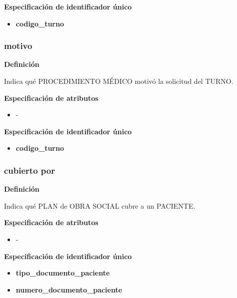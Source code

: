 \documentclass[a4paper,11pt]{article}
\begin{document}
\textbf{Especificación de identificador único}

\begin{itemize}

     \item \textbf{codigo\_turno}

\end{itemize}



\subsubsection{\textbf{motivo}}

\textbf{Definición}

Indica qué PROCEDIMIENTO MÉDICO motivó la solicitud del TURNO.

\textbf{Especificación de atributos}

\begin{itemize}

	\item -

\end{itemize}

\textbf{Especificación de identificador único}

\begin{itemize}

     \item \textbf{codigo\_turno}

\end{itemize}

\subsubsection{\textbf{cubierto por}}

\textbf{Definición}

Indica qué PLAN de OBRA SOCIAL cubre a un PACIENTE.

\textbf{Especificación de atributos}

\begin{itemize}

	\item -

\end{itemize}

\textbf{Especificación de identificador único}

\begin{itemize}

    \item \textbf{tipo\_documento\_paciente}

    \item \textbf{numero\_documento\_paciente}

\end{itemize}
\end{document}
